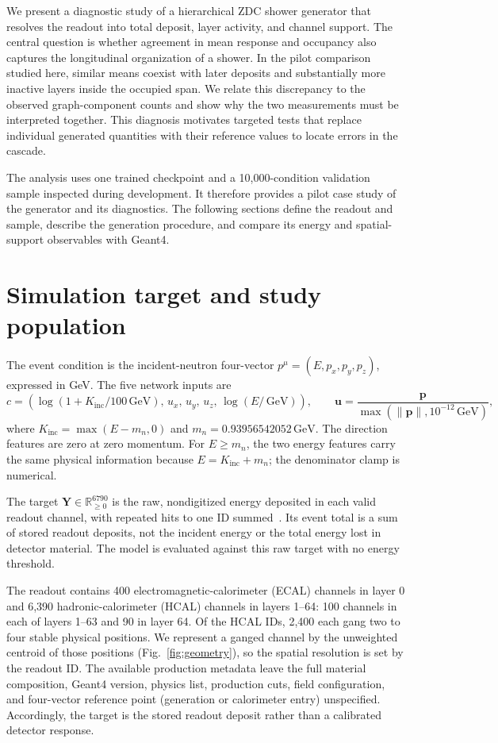 \documentclass[11pt]{article}
\newcommand{\GeV}{\,\mathrm{GeV}}
\newcommand{\Kinc}{K_{\mathrm{inc}}}
\newcommand{\Y}{\mathbf{Y}}
\begin{document}
We present a diagnostic study of a hierarchical ZDC shower generator that resolves the readout into total deposit, layer activity, and channel support. The central question is whether agreement in mean response and occupancy also captures the longitudinal organization of a shower. In the pilot comparison studied here, similar means coexist with later deposits and substantially more inactive layers inside the occupied span. We relate this discrepancy to the observed graph-component counts and show why the two measurements must be interpreted together. This diagnosis motivates targeted tests that replace individual generated quantities with their reference values to locate errors in the cascade.

The analysis uses one trained checkpoint and a 10,000-condition validation sample inspected during development. It therefore provides a pilot case study of the generator and its diagnostics. The following sections define the readout and sample, describe the generation procedure, and compare its energy and spatial-support observables with Geant4.

\section{Simulation target and study population}
\label{sec:data}

The event condition is the incident-neutron four-vector $p^\mu=(E,p_x,p_y,p_z)$, expressed in GeV. The five network inputs are
\begin{equation}
 c=\left(\log(1+\Kinc/100\GeV),\,u_x,\,u_y,\,u_z,\,\log(E/\GeV)\right),
 \qquad \mathbf u=\frac{\mathbf p}{\max(\lVert\mathbf p\rVert,10^{-12}\GeV)},
 \label{eq:condition}
\end{equation}
where $\Kinc=\max(E-m_n,0)$ and $m_n=0.93956542052\GeV$. The direction features are zero at zero momentum. For $E\geq m_n$, the two energy features carry the same physical information because $E=\Kinc+m_n$; the denominator clamp is numerical.

The target $\Y\in\mathbb R_{\geq0}^{6790}$ is the raw, nondigitized energy deposited in each valid readout channel, with repeated hits to one ID summed~\cite{geant4}. Its event total is a sum of stored readout deposits, not the incident energy or the total energy lost in detector material. The model is evaluated against this raw target with no energy threshold.

The readout contains 400 electromagnetic-calorimeter (ECAL) channels in layer 0 and 6,390 hadronic-calorimeter (HCAL) channels in layers 1--64: 100 channels in each of layers 1--63 and 90 in layer 64. Of the HCAL IDs, 2,400 each gang two to four stable physical positions. We represent a ganged channel by the unweighted centroid of those positions (Fig.~\ref{fig:geometry}), so the spatial resolution is set by the readout ID. The available production metadata leave the full material composition, Geant4 version, physics list, production cuts, field configuration, and four-vector reference point (generation or calorimeter entry) unspecified. Accordingly, the target is the stored readout deposit rather than a calibrated detector response.
\end{document}
